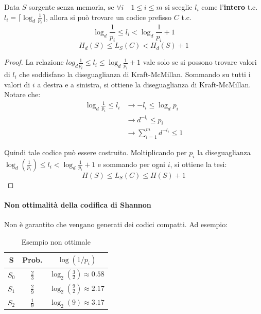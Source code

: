 \begin{theorem}
Data $S$ sorgente senza memoria, se $\forall i \quad 1\leq  i \leq m$ si sceglie $l_i$ come l'\textbf{intero} \mbox{t.c.} $l_i = \lceil \log_d\frac{1}{p_i} \rceil$, allora si può trovare un codice prefisso $C$ \mbox{t.c.}
\[ \log_d\frac{1}{p_i} \leq l_i < \log_d \frac{1}{p_i} + 1\]
\[H_d(S) \leq L_S(C) < H_d(S) + 1\]

\begin{proof}
 La relazione $log_d\frac{1}{p_i} \leq l_i \leq \log_d \frac{1}{p_i} + 1$ vale solo se si possono trovare valori di $l_i$ che soddisfano la diseguaglianza di Kraft-McMillan.
 Sommando su tutti i valori di $i$ a destra e a sinistra, si ottiene la diseguaglianza di Kraft-McMillan.
 Notare che:
\begin{align*}
    \log_d\frac{1}{p_i} \leq l_i &\rightarrow -l_i \leq \log_d p_i \\
    &\rightarrow d^{-l_i} \leq p_i \\
    &\rightarrow \sum_{i=1}^m d^{-l_i} \leq 1
\end{align*}

Quindi tale codice può essere costruito.
Moltiplicando per $p_i$ la diseguaglianza $\log_d(\frac{1}{p_i}) \leq l_i < \log_d\frac{1}{p_i} +1$ e sommando per ogni $i$, si ottiene la tesi:
\[H(S) \leq L_S(C) \leq H(S) + 1\]
\end{proof}
\end{theorem}

\paragraph{\textbf{Non} ottimalità della codifica di Shannon}
Non è garantito che vengano generati dei codici compatti.
Ad esempio:

\begin{table}[htbp]
\centering
\renewcommand{\arraystretch}{1.5}
\begin{tabular}{
    >{\columncolor{blue!20}}c  %
    | c 
    | c
}
\rowcolor{blue!50} 
\textbf{S} & \textbf{Prob.} & \textbf{$\log(1/p_i)$} \\

\hline
$S_0$ & $\frac{2}{3}$ & $\log_2\left(\frac{3}{2}\right) \approx 0{.}58$ \\
$S_1$ & $\frac{2}{9}$ & $\log_2\left(\frac{9}{2}\right) \approx 2{.}17$ \\
$S_2$ & $\frac{1}{9}$ & $\log_2(9) \approx 3{.}17$ \\
\end{tabular}
\caption{Esempio non ottimale}

\end{table}

